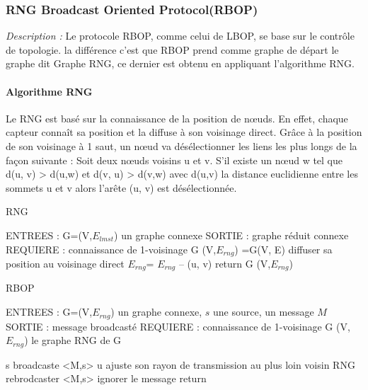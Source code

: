 \subsubsection{ RNG Broadcast Oriented Protocol(RBOP) \cite{Cartigny2005}}

\emph{Description :}
Le protocole RBOP, comme celui de LBOP, se base sur le contrôle de topologie.
la différence c’est que RBOP prend comme graphe de départ le graphe dit Graphe RNG, ce
dernier est obtenu en appliquant l’algorithme RNG.

\paragraph{Algorithme RNG}
Le RNG est basé sur la connaissance de la position de nœuds. En effet, chaque capteur
connaît sa position et la diffuse à son voisinage direct. Grâce à la position de son voisinage à 1 saut,
un nœud va désélectionner les liens les plus longs de la façon suivante :
Soit deux nœuds voisins u et v. S’il existe un nœud w tel que d(u, v) > d(u,w) et d(v, u) > d(v,w) avec
d(u,v) la distance euclidienne entre les sommets u et v alors l’arête (u, v) est désélectionnée.

\begin{algorithm}[H]
\caption{RNG}
\label{alg RNG}
\begin{algorithmic}
\STATE ENTREES : G=(V,$E_{lmst}$) un graphe connexe
\STATE SORTIE : graphe réduit connexe
\STATE REQUIERE : connaissance de 1-voisinage
\STATE G (V,$E_{rng}$) =G(V, E)
\STATE diffuser sa position au voisinage direct
			\STATE 	$E_{rng}$= $E_{rng}$ – (u, v)
			\ENDIF
		\ENDFOR
	\ENDFOR
\ENDFOR
\STATE return G (V,$E_{rng}$)

\end{algorithmic}
\end{algorithm}

\begin{algorithm}[H]
\caption{RBOP}
\label{alg RBOP}
\begin{algorithmic}
\STATE ENTREES : G=(V,$E_{rng}$) un graphe connexe, $s$ une source, un message $M$
\STATE SORTIE : message broadcasté
\STATE REQUIERE : connaissance de 1-voisinage
\STATE G (V,$E_{rng}$) le graphe RNG de G

\STATE s broadcaste <M,s>
\STATE u ajuste son rayon de transmission au plus loin voisin RNG
	\STATE 	rebrodcaster <M,s>
	\ELSE 
	\STATE ignorer le message
	\ENDIF
\ENDFOR	
\STATE return

\end{algorithmic}
\end{algorithm}



